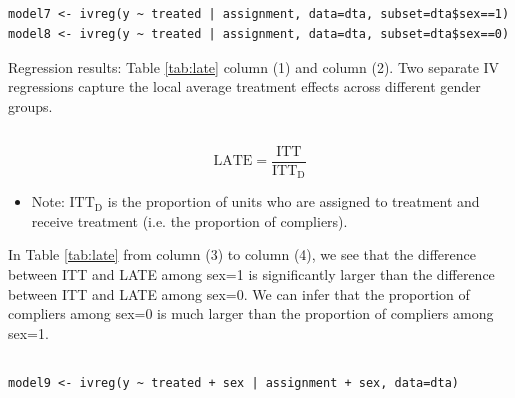 \documentclass[a4paper]{article}
\begin{document}


\subsection{}

\begin{verbatim}
model7 <- ivreg(y ~ treated | assignment, data=dta, subset=dta$sex==1)
model8 <- ivreg(y ~ treated | assignment, data=dta, subset=dta$sex==0)
\end{verbatim}
Regression results: Table \ref{tab:late} column (1) and column (2).
Two separate IV regressions capture the local average treatment effects across different gender groups.



\subsection{}

\begin{equation*}
    \textrm{LATE}=\frac{\mathrm{ITT}}{\mathrm{ITT_D}}
\end{equation*}
\begin{itemize}
    \item Note: $\mathrm{ITT_D}$ is the proportion of units who are assigned to treatment and receive treatment (i.e. the proportion of compliers).
\end{itemize}

In Table \ref{tab:late} from column (3) to column (4), we see that the difference between ITT and LATE among sex=1 is significantly larger than the difference between ITT and LATE among sex=0. We can infer that the proportion of compliers among sex=0 is much larger than the proportion of compliers among sex=1.


\subsection{}

\begin{verbatim}
model9 <- ivreg(y ~ treated + sex | assignment + sex, data=dta)
\end{verbatim}
\end{document}
